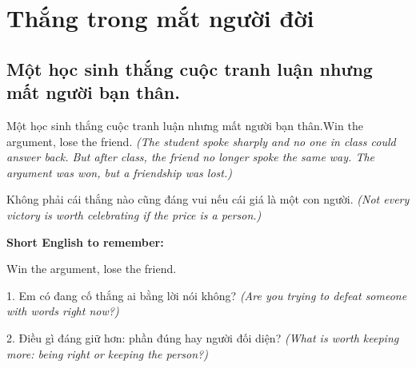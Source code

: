 \chapter{Thắng trong mắt người đời}

\section{Một học sinh thắng cuộc tranh luận nhưng mất người bạn thân.}
\begin{truyen}{Một học sinh thắng cuộc tranh luận nhưng mất người bạn thân.}{Win the argument, lose the friend.}
\textit{(The student spoke sharply and no one in class could answer back. But after class, the friend no longer spoke the same way. The argument was won, but a friendship was lost.)}
\end{truyen}
\begin{baihoc}
Không phải cái thắng nào cũng đáng vui nếu cái giá là một con người.
\textit{(Not every victory is worth celebrating if the price is a person.)}
\end{baihoc}
\begin{ghinhoanh}\textbf{Short English to remember:}

Win the argument, lose the friend.
\end{ghinhoanh}
\begin{tuhocnhanh}
1. Em có đang cố thắng ai bằng lời nói không? \textit{(Are you trying to defeat someone with words right now?)}

2. Điều gì đáng giữ hơn: phần đúng hay người đối diện? \textit{(What is worth keeping more: being right or keeping the person?)}
\end{tuhocnhanh}
\ngancach

